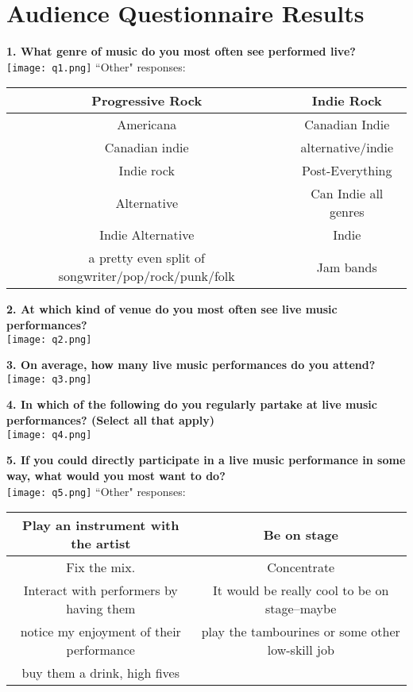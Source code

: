 \chapter{Audience Questionnaire Results}

\clearpage

\begin{center}

\textbf{1. What genre of music do you most often see performed live?}\\
\texttt{[image: q1.png]}
``Other" responses:\\[0.25cm]
\begin{tabular}{|c|c|}
\hline
Progressive Rock & Indie Rock\\ \hline
Americana & Canadian Indie\\ \hline
Canadian indie & alternative/indie\\ \hline
Indie rock & Post-Everything\\ \hline
Alternative & Can Indie all genres\\ \hline
Indie Alternative & Indie\\ \hline
a pretty even split of songwriter/pop/rock/punk/folk & Jam bands\\
\hline
\end{tabular}

\vspace{1cm}

\textbf{2. At which kind of venue do you most often see live music performances?}\\
\texttt{[image: q2.png]}

\vspace{0.5cm}

\textbf{3. On average, how many live music performances do you attend?}\\
\texttt{[image: q3.png]}

\vspace{0.5cm}

\textbf{4. In which of the following do you regularly partake at live music performances? (Select all that apply)}\\
\texttt{[image: q4.png]}

\clearpage

\textbf{5. If you could directly participate in a live music performance in some way, what would you most want to do?}\\
\texttt{[image: q5.png]}
``Other" responses:\\[0.25cm]
\begin{tabular}{|c|c|}
\hline
Play an instrument with the artist & Be on stage\\ \hline
Fix the mix. & Concentrate\\ \hline
Interact with performers by having them & It would be really cool to be on stage--maybe\\
notice my enjoyment of their performance & play the tambourines or some other low-skill job\\ \hline
buy them a drink, high fives & \\
\hline
\end{tabular}


\end{center}
